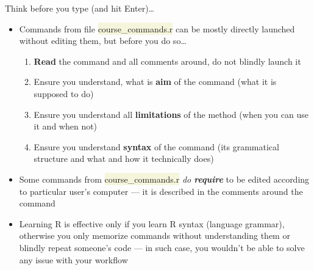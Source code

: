 \documentclass[compress, ucs, xelatex, 11pt, xcolor=svgnames, aspectratio=169,
	hyperref={
		bookmarks=true,
		unicode=true,
		colorlinks=true,
		pdftitle={Molecular data in R},
		plainpages=false,
		pdfauthor={Vojtech Zeisek},
		pdfsubject={Course about phylogeny and evolution in R},
		pdfcreator={XeLaTeX},
		pdfkeywords={R, evolution, phylogeny, molecular data},
		linkcolor=Crimson, %
		anchorcolor=Magenta, %
		citecolor=Magenta, %
		filecolor=Magenta, %
		menucolor=Magenta, %
		urlcolor=DodgerBlue, %
		pdftex},
	url={hyphens, lowtilde} %
	]{beamer}
\renewcommand{\texttt}[1]{\colorbox{Beige}{{\ttfamily #1}}}
\begin{document}
\begin{frame}{Think before you type (and hit Enter)\ldots}
	\begin{itemize}
		\item Commands from file \texttt{course\_commands.r} can be mostly directly launched without editing them, but before you do so\ldots
		\begin{enumerate}
			\item \textbf{Read} the command and all comments around, do not blindly launch it
			\item Ensure you understand, what is \textbf{aim} of the command (what it is supposed to do)
			\item Ensure you understand all \textbf{limitations} of the method (when you can use it and when not)
			\item Ensure you understand \textbf{syntax} of the command (its grammatical structure and what and how it technically does)
		\end{enumerate}
		\item Some \alert{commands} from \texttt{course\_commands.r} \alert{\textit{do \textbf{require}} to be edited} according to particular user's computer --- it is described in the comments around the command
		\item Learning R is effective only if you learn R syntax (language grammar), otherwise you only memorize commands without understanding them or blindly repeat someone's code --- in such case, you wouldn't be able to solve any issue with your workflow
	\end{itemize}
\end{frame}
\end{document}
